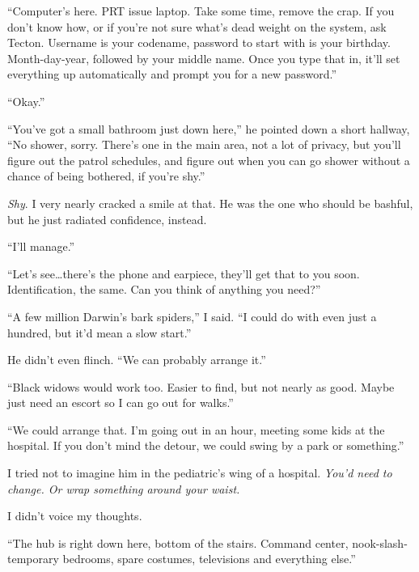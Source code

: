 ``Computer's here.  PRT issue laptop.  Take some time, remove the crap.  If you don't know how, or if you're not sure what's dead weight on the system, ask Tecton.  Username is your codename, password to start with is your birthday.  Month-day-year, followed by your middle name.  Once you type that in, it'll set everything up automatically and prompt you for a new password.''



``Okay.''



``You've got a small bathroom just down here,'' he pointed down a short hallway, ``No shower, sorry.  There's one in the main area, not a lot of privacy, but you'll figure out the patrol schedules, and figure out when you can go shower without a chance of being bothered, if you're shy.''



\emph{Shy}.  I very nearly cracked a smile at that.  He was the one who should be bashful, but he just radiated confidence, instead.



``I'll manage.''



``Let's see\ldots there's the phone and earpiece, they'll get that to you soon.  Identification, the same.  Can you think of anything you need?''



``A few million Darwin's bark spiders,'' I said.  ``I could do with even just a hundred, but it'd mean a slow start.''



He didn't even flinch.  ``We can probably arrange it.''



``Black widows would work too.  Easier to find, but not nearly as good.  Maybe just need an escort so I can go out for walks.''



``We could arrange that.  I'm going out in an hour, meeting some kids at the hospital.  If you don't mind the detour, we could swing by a park or something.''



I tried not to imagine him in the pediatric's wing of a hospital.  \emph{You'd need to change.  Or wrap something around your waist.}



I didn't voice my thoughts.



``The hub is right down here, bottom of the stairs.  Command center, nook-slash-temporary bedrooms, spare costumes, televisions and everything else.''



